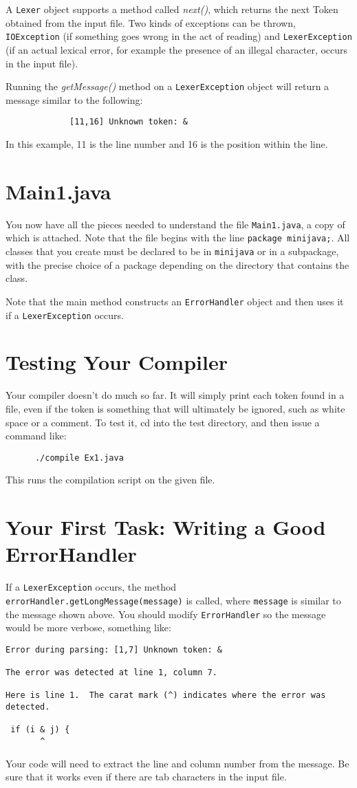 \documentclass[11pt]{article}
\begin{document}
A {\tt Lexer} object supports a method called {\em next()}, which returns
the next Token obtained from the input file.  Two kinds of
exceptions can be thrown, {\tt IOException} (if something goes wrong
in the act of reading) and {\tt LexerException} (if an actual lexical
error, for example the presence of an illegal character, occurs
in the input file).

Running the {\em getMessage()} method on a {\tt LexerException} object will
return a message similar to the following:
\begin{verbatim}
      	     [11,16] Unknown token: & 
\end{verbatim}
In this example, 11 is the line number and 16 is the position
within the line.

\section{Main1.java}
You now have all the pieces needed to understand the file {\tt Main1.java}, a copy of which is attached.  Note that the file begins with the line \verb'package minijava;'.  All classes that you create must be declared to be in {\tt minijava} or in a subpackage, with the precise choice of a package depending on the directory that contains the class.

Note that the main method constructs an {\tt ErrorHandler} object and then uses it if a {\tt LexerException} occurs.

\section{Testing Your Compiler}
Your compiler doesn't do much so far.  It will simply print each token found in a file, even if the token is something that will ultimately be ignored, such as white space or a comment.  To test it,
cd into the test directory, and then issue a command like:
\begin{verbatim}
      ./compile Ex1.java
\end{verbatim}
This runs the compilation script on the given file.

\section{Your First Task:  Writing a Good ErrorHandler}

If a {\tt LexerException} occurs, the method {\tt errorHandler.getLongMessage(message)} is called, where {\tt message} is similar to the message shown above.  You should modify {\tt ErrorHandler} so the message would be more verbose, something like:
\begin{verbatim}
Error during parsing: [1,7] Unknown token: &

The error was detected at line 1, column 7.

Here is line 1.  The carat mark (^) indicates where the error was detected.

 if (i & j) {
       ^
\end{verbatim}
Your code will need to extract the line and column number from the message.  Be sure that it works even if there are tab characters in the input file.
\end{document}
